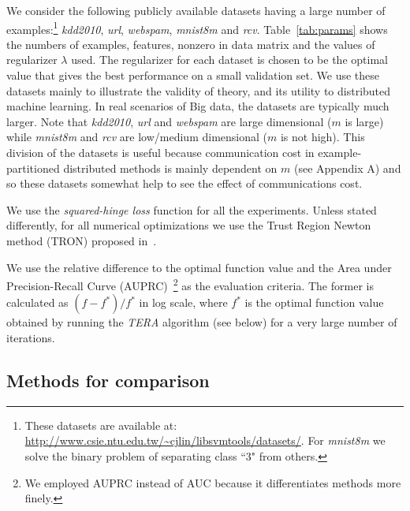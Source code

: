 \documentclass[twoside, 11pt]{article}
\begin{document}
 We consider the following publicly available datasets having a large number of examples:\footnote{These datasets are available at: \url{http://www.csie.ntu.edu.tw/~cjlin/libsvmtools/datasets/}. For {\it mnist8m} we solve the binary problem of separating class ``3" from others.}
{\it{kdd2010}}, {\it{url}}, {\it{webspam}}, {\it{mnist8m}} and {\it{rcv}}. Table~\ref{tab:params} shows the numbers of examples, features, nonzero in data matrix and the values of regularizer $\lambda$ used. The regularizer for each dataset is chosen to be the optimal value that gives the best performance on a small validation set. We use these datasets mainly to illustrate the validity of theory, and its utility to distributed machine learning. In real scenarios of Big data, the datasets are typically much larger. Note that {\it kdd2010}, {\it url} and {\it webspam} are large dimensional ($m$ is large) while {\it mnist8m} and {\it rcv} are low/medium dimensional ($m$ is not high). This division of the datasets is useful because communication cost in example-partitioned distributed methods is mainly dependent on $m$ (see Appendix A) and so these datasets somewhat help to see the effect of communications cost.

We use the {\it squared-hinge loss} function for all the experiments. Unless stated differently, for all numerical optimizations we use the Trust Region Newton method (TRON) proposed in~\citet{lin2008}.

\vspace*{0.1in}

 We use the relative difference to the optimal function value and the Area under Precision-Recall Curve (AUPRC)~\citep{sonnenburg2010, alekh2013}\footnote{We employed AUPRC instead of AUC because it differentiates methods more finely.} as the evaluation criteria. The former is calculated as $(f-f^*)/f^*$ in log scale, where $f^*$ is the optimal function value obtained by running the {\it{TERA}} algorithm (see below) for a very large number of iterations.



\subsection{Methods for comparison}
\label{subsec:methods}

\end{document}
